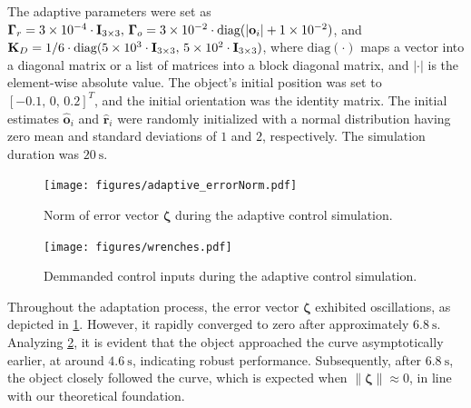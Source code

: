 The adaptive parameters were set as $\boldsymbol{\Gamma}_r=\num{3E-4}\cdot\mathbf{I}_{3\times3},\, \boldsymbol{\Gamma}_o=\num{3E-2}\cdot\text{diag}(|\mathbf{o}_i| + \num{1E-2}) $, and $\mathbf{K}_D=1\slash6\cdot\text{diag}(\num{5E3}\cdot\mathbf{I}_{3\times3},\,\num{5E2}\cdot\mathbf{I}_{3\times3})$, where $\text{diag}(\cdot)$ maps a vector into a diagonal matrix or a list of matrices into a block diagonal matrix, and $|\cdot|$ is the element-wise absolute value. The object's initial position was set to $[-0.1,\, 0,\, 0.2]^T$, and the initial orientation was the identity matrix. The initial estimates $\hat{\mathbf{o}}_i$ and $\hat{\mathbf{r}}_i$ were randomly initialized with a normal distribution having zero mean and standard deviations of $1$ and $2$, respectively. The simulation duration was $\qty{20}{\second}$.
\begin{figure}[htb]
    \centering
    \texttt{[image: figures/adaptive\_errorNorm.pdf]}
    \vspace{-1mm}
    \caption{Norm of error vector $\boldsymbol{\zeta}$ during the adaptive control simulation.}
    \label{fig:sim2-snorm}
\end{figure}
\begin{figure}[htb]
    \centering
    \texttt{[image: figures/wrenches.pdf]}
    \vspace{-1mm}
    \caption{Demmanded control inputs during the adaptive control simulation.}
    \label{fig:sim2-metricvalue}
\end{figure}

Throughout the adaptation process, the error vector $\boldsymbol{\zeta}$ exhibited oscillations, as depicted in \cref{fig:sim2-snorm}. However, it rapidly converged to zero after approximately $\qty{6.8}{\second}$. Analyzing \cref{fig:sim2-metricvalue}, it is evident that the object approached the curve asymptotically earlier, at around $\qty{4.6}{\second}$, indicating robust performance. Subsequently, after $\qty{6.8}{\second}$, the object closely followed the curve, which is expected when $\|\boldsymbol{\zeta}\|\approx0$, in line with our theoretical foundation.